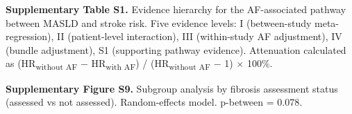 \documentclass[12pt,a4paper]{article}
\begin{document}
\textbf{Supplementary Table S1.} Evidence hierarchy for the AF-associated pathway between MASLD and stroke risk. Five evidence levels: I (between-study meta-regression), II (patient-level interaction), III (within-study AF adjustment), IV (bundle adjustment), S1 (supporting pathway evidence). Attenuation calculated as (HR\textsubscript{without AF} $-$ HR\textsubscript{with AF}) / (HR\textsubscript{without AF} $-$ 1) $\times$ 100\%.

\textbf{Supplementary Figure S9.} Subgroup analysis by fibrosis assessment status (assessed vs not assessed). Random-effects model. p-between = 0.078.
\end{document}
